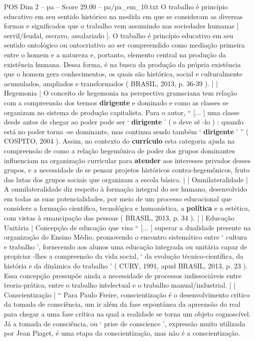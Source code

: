 \begin{textsample}{POS Dim 2 – pa – Score 29.00 – pa/pa\_em\_10.txt}
O trabalho é princípio educativo em seu sentido histórico na medida em que se consideram as diversas formas e significados que o trabalho vem assumindo nas sociedades humanas [ servil/feudal, escravo, assalariado ].
O trabalho é princípio educativo em seu sentido ontológico ou ontocriativo ao ser compreendido como mediação primeira entre o homem e a natureza e, portanto, elemento central na produção da existência humana.
Dessa forma, é na busca da produção da própria existência que o homem gera conhecimentos, os quais são histórica, social e culturalmente acumulados, ampliados e transformados ( BRASIL, 2013, p. 36-39 ). | | Hegemonia | O conceito de hegemonia na perspectiva gramsciana tem relação com a compreensão dos termos \textbf{dirigente} e dominado e como as classes se organizam no sistema de produção capitalista.
Para o autor, “ [... ] uma classe desde antes de chegar ao poder pode ser ‘ \textbf{dirigente} ’ ( e deve sê -lo ) : quando está no poder torna -se dominante, mas continua sendo também ‘ \textbf{dirigente} ’ ” ( COSPITO, 2004 ).
Assim, no contexto do \textbf{currículo} esta categoria ajuda na compreensão de como a relação hegemônica de poder dos grupos dominantes influenciam na organização curricular para \textbf{atender} aos interesses privados desses grupos, e a necessidade de se pensar projetos históricos contra-hegemônicos, fruto das lutas dos grupos sociais que organizam a escola básica. | | Omnilateralidade | A omnilateralidade diz respeito à formação integral do ser humano, desenvolvido em todas as suas potencialidades, por meio de um processo educacional que considere a formação científica, tecnológica e humanística, a \textbf{política} e a estética, com vistas à emancipação das pessoas ( BRASIL, 2013, p. 34 ). | | Educação Unitária | Concepção de educação que visa “ [... ] superar a dualidade presente na organização do Ensino Médio, promovendo o encontro sistemático entre ‘ cultura e trabalho ’, fornecendo aos alunos uma educação integrada ou unitária capaz de propiciar -lhes a compreensão da vida social, ‘ da evolução técnico-científica, da história e da dinâmica do trabalho ’ ( CURY, 1991, apud BRASIL, 2013, p. 23 ).
Essa concepção pressupõe ainda a necessidade de processos indissociáveis entre teoria-prática, entre o trabalho intelectual e o trabalho manual/industrial. | | Conscientização | “ Para Paulo Freire, conscientização é o desenvolvimento crítico da tomada de consciência, um ir além da fase espontânea da apreensão do real para chegar a uma fase crítica na qual a realidade se torna um objeto cognoscível.
Já a tomada de consciência, ou ‘ prise de conscience ’, expressão muito utilizada por Jean Piaget, é uma etapa da conscientização, mas não é a conscientização.

\end{textsample}
